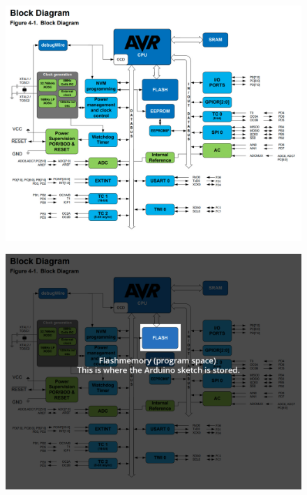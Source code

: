 \begin{frame}
	\begin{figure}
		\includegraphics[scale=.45]{assets/block}  
	\end{figure}
\end{frame}

\begin{frame}
	\begin{figure}
		\includegraphics[scale=.2]{assets/flash}  
	\end{figure}
\end{frame}

